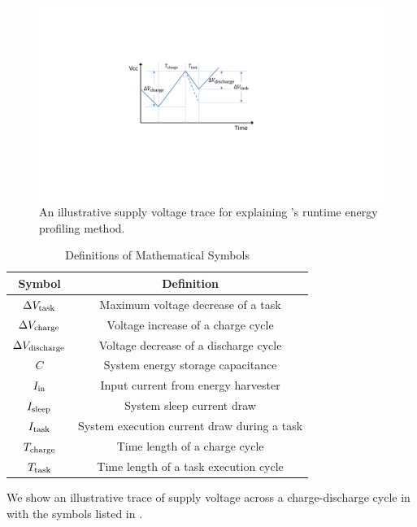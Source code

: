 \begin{figure}[!t]
    \centering
    \includegraphics[width=0.8\columnwidth]{ch5_optic/figures/temp.pdf}
    \caption{An illustrative supply voltage trace for explaining \nn{}'s runtime energy profiling method. }
    \label{fig:math}
\end{figure}

\begin{table}[!t]
    \renewcommand{\arraystretch}{1.2}
    \centering
    \caption{Definitions of Mathematical Symbols}
    \label{tab:symbols}
    \begin{tabular}{|c|c|}
    \hline
    \textbf{Symbol} & \textbf{Definition} \\
    \hline
    $\Delta V_{\text{task}}$ & Maximum voltage decrease of a task \\
    $\Delta V_{\text{charge}}$ & Voltage increase of a charge cycle \\
    $\Delta V_{\text{discharge}}$ & Voltage decrease of a discharge cycle \\
    $C$ & System energy storage capacitance \\
    $I_{\text{in}}$ & Input current from energy harvester \\
    $I_{\text{sleep}}$ & System sleep current draw \\
    $I_{\text{task}}$ & System execution current draw during a task \\
    $T_{\text{charge}}$ & Time length of a charge cycle  \\
    $T_{\text{task}}$ & Time length of a task execution cycle  \\
    \hline
    \end{tabular}
\end{table}

We show an illustrative trace of supply voltage across a charge-discharge cycle in  with the symbols listed in . 

